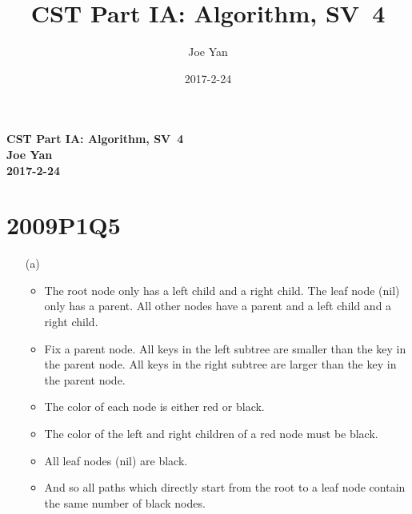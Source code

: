 \documentclass[10pt,twoside,a4paper]{article}
\newcommand{\studentname}{Joe Yan}
\newcommand{\svworkdate}{2017-2-24}
\newcommand{\svcourse}{CST Part IA: Algorithm}
\newcommand{\svnumber}{4}
\begin{document}
\author{\studentname}
\title{\svcourse, SV~\svnumber}
\date{\svworkdate}

\textbf{\svcourse, SV~\svnumber}\\
\textbf{\studentname}\\
\textbf{\svworkdate}\\

\section{2009P1Q5}
\begin{itemize}
\item[(a)]
\begin{itemize}
\item The root node only has a left child and a right child. The leaf node (nil) only has a parent. All other nodes have a parent and a left child and a right child.
\item Fix a parent node. All keys in the left subtree are smaller than the key in the parent node. All keys in the right subtree are larger than the key in the parent node.
\item The color of each node is either red or black.
\item The color of the left and right children of a red node must be black.
\item All leaf nodes (nil) are black.
\item And so all paths which directly start from the root to a leaf node contain the same number of black nodes.
\end{itemize}


\end{itemize}
\end{document}
